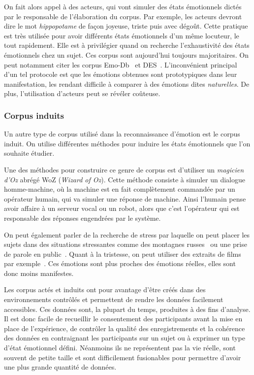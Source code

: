 On fait alors appel à des acteurs, qui vont simuler des états émotionnels dictés par le responsable de l'élaboration du corpus. Par exemple, les acteurs devront dire le mot \textit{hippopotame} de façon joyeuse, triste puis avec dégoût. Cette pratique est très utilisée pour avoir différents états émotionnels d'un même locuteur, le tout rapidement. Elle est à privilégier quand on recherche l'exhaustivité des états émotionnels chez un sujet. Ces corpus sont aujourd'hui toujours majoritaires. On peut notamment citer les corpus Emo-Db~\cite{Burkhardt2005} et DES~\cite{Engberg1997}. L'inconvénient principal d'un tel protocole est que les émotions obtenues sont prototypiques dans leur manifestation, les rendant difficile à comparer à des émotions dites \textit{naturelles}. De plus, l'utilisation d'acteurs peut se révéler coûteuse.

\subsubsection{Corpus induits}
Un autre type de corpus utilisé dans la reconnaissance d'émotion est le corpus induit. On utilise différentes méthodes pour induire les états émotionnels que l'on souhaite étudier.

Une des méthodes pour construire ce genre de corpus est d'utiliser un \textit{magicien d'Oz} abrégé WoZ (\textit{Wizard of Oz}). Cette méthode consiste à simuler un dialogue homme-machine, où la machine est en fait complètement commandée par un opérateur humain, qui va simuler une réponse de machine. Ainsi l'humain pense avoir affaire à un serveur vocal ou un robot, alors que c'est l'opérateur qui est responsable des réponses engendrées par le système.

On peut également parler de la recherche de stress par laquelle on peut placer les sujets dans des situations stressantes comme des montagnes russes~\cite{Hansen1997} ou une prise de parole en public~\cite{Giraud2013}. Quant à la tristesse, on peut utiliser des extraits de films par exemple~\cite{Schuller2010cinemo}. Ces émotions sont plus proches des émotions réelles, elles sont donc moins manifestes.

Les corpus actés et induits ont pour avantage d'être créés dans des environnements contrôlés et permettent de rendre les données facilement accessibles. Ces données sont, la plupart du temps, produites à des fins d'analyse. Il est donc facile de recueillir le consentement des participants avant la mise en place de l'expérience, de contrôler la qualité des enregistrements et la cohérence des données en contraignant les participants sur un sujet ou à exprimer un type d'état émotionnel défini. Néanmoins ils ne représentent pas la vie réelle, sont souvent de petite taille et sont difficilement fusionables pour permettre d'avoir une plus grande quantité de données.

